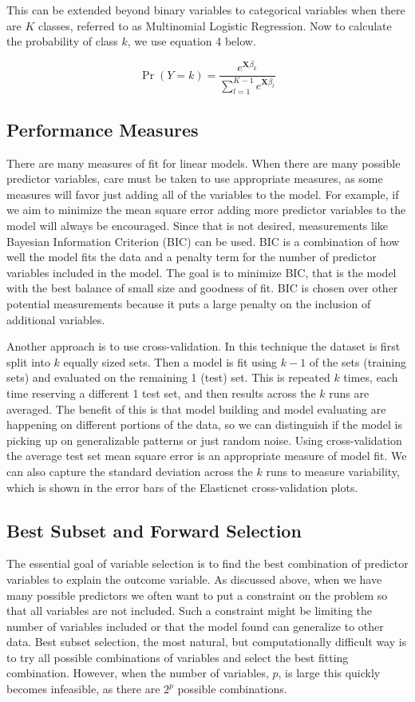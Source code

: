 \documentclass{article}
\newcommand{\bX}{\mathbf{X}}
\begin{document}
This can be extended beyond binary variables to categorical variables when there are $K$ classes, referred to as Multinomial 
Logistic Regression. Now to calculate the probability of class $k$, we use equation 4 below.

\[ \Pr(Y = k) = \frac{e^{\bX\beta_k}}{\sum_{l=1}^{K-1} e^{\bX\beta_l}} \tag{4}\]

\subsection{Performance Measures}

There are many measures of fit for linear models. When there are many possible predictor variables, care must be taken 
to use appropriate measures, as some measures will favor just adding all of the variables to the model. For example, if we 
aim to minimize the mean square error adding more predictor variables to the model will always be encouraged. Since that is 
not desired, measurements like Bayesian Information Criterion (BIC) can be used. BIC is a combination of how well the model 
fits the data and a penalty term for the number of predictor variables included in the model. The goal is to minimize BIC, that is 
the model with the best balance of small size and goodness of fit. BIC is chosen over other potential measurements because it 
puts a large penalty on the inclusion of additional variables.

Another approach is to use cross-validation. In this technique the dataset is first split into $k$ equally sized sets. Then a 
model is fit using $k - 1$ of the sets (training sets) and evaluated on the remaining 1 (test) set. This is repeated $k$ times, 
each time reserving a different 1 test set, and then results across the $k$ runs are averaged. The benefit of this is that model 
building and model evaluating are happening on different portions of the data, so we can distinguish if the model is picking up 
on generalizable patterns or just random noise. Using cross-validation the average test set mean square error is an 
appropriate measure of model fit. We can also capture the standard deviation across the $k$ runs to measure variability, which is shown in the error bars of the Elasticnet cross-validation plots.

\subsection{Best Subset and Forward Selection}

The essential goal of variable selection is to find the best combination of predictor variables to explain the outcome variable. As 
discussed above, when we have many possible predictors we often want to put a constraint on the problem so that all variables 
are not included. Such a constraint might be limiting the number of variables included or that the model found can generalize to 
other data. Best subset selection, the most natural, but computationally difficult way is to try all possible combinations of 
variables and select the best fitting combination. However, when the number of variables, $p$, is large this quickly becomes 
infeasible, as there are $2^p$ possible combinations. 
\end{document}
